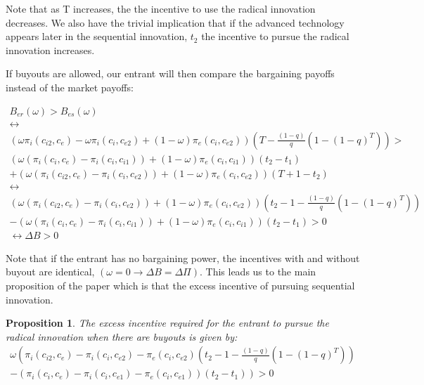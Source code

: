 \documentclass[11pt]{article}
\newtheorem{proposition}{Proposition}
\begin{document}
Note that as T increases, the the incentive to use the radical innovation decreases. We also have the trivial implication that if the advanced technology appears later in the sequential innovation, $t_2$ the incentive to pursue the radical innovation increases. 

If buyouts are allowed, our entrant will then compare the bargaining payoffs instead of the market payoffs: 

\begin{align*}
B_{er}(\omega) > B_{es}(\omega) \\
\leftrightarrow \\
\left(\omega\pi_{i}(c_{i2},c_{e})-\omega \pi_{i}(c_{i},c_{e2})+(1-\omega)\pi_{e}(c_{i},c_{e2}) \right) \left( T - \frac{(1-q)}{q} \left( 1-(1-q)^T \right) \right)> \\ 
(\omega(\pi_i(c_i,c_{e})-\pi_i(c_i,c_{i1}))+(1-\omega)\pi_e(c_i,c_{i1}))(t_2-t_1) \\
+(\omega(\pi_i(c_{i2},c_e)- \pi_i(c_{i},c_{e2}))+(1-\omega)\pi_e(c_{i},c_{e2}))(T+1-t_2) \\
\leftrightarrow \\
\left(\omega (\pi_{i}(c_{i2},c_{e})- \pi_{i}(c_{i},c_{e2}))+(1-\omega)\pi_{e}(c_{i},c_{e2}) \right) \left( t_2-1 - \frac{(1-q)}{q} \left( 1-(1-q)^T \right) \right)  \\
-(\omega(\pi_i(c_i,c_{e})-\pi_i(c_i,c_{i1}))+(1-\omega)\pi_e(c_i,c_{i1}))(t_2-t_1)>0 \\
\leftrightarrow
\Delta B > 0
\end{align*}

Note that if the entrant has no bargaining power, the incentives with and without buyout are identical, $(\omega=0 \rightarrow \Delta B = \Delta \Pi)$. This leads us to the main proposition of the paper which is that the excess incentive of pursuing sequential innovation. 

\begin{proposition}
The excess incentive required for the entrant to pursue the radical innovation when there are buyouts is given by: 
\begin{align*}
\omega \left(  \pi_{i}(c_{i2},c_{e})- \pi_{i}(c_{i},c_{e2})-\pi_{e}(c_{i},c_{e2})  \left( t_2-1  - \frac{(1-q)}{q} \left( 1-(1-q)^T \right) \right) \right. \\
-\left.(\pi_i(c_i,c_{e})-\pi_i(c_i,c_{e1})-\pi_e(c_i,c_{e1}))(t_2-t_1) \right)  >0 \\
\end{align*}
\end{proposition}
\end{document}

